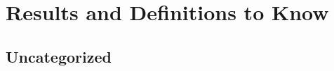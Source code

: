 \setchapterpreamble[u]{\margintoc}
\chapter{Results and Definitions to Know}

\section{Uncategorized}

\begin{theorem}
    
\end{theorem}

\begin{theorem}
    
\end{theorem}